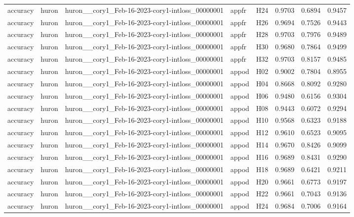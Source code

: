 \begin{table}[tbp]
\begin{tabular}{lllllrrr}
accuracy & huron & huron\_\_cory1\_Feb-16-2023-cory1-intloss\_00000001 & appfr & H24 & 0.9703 & 0.6894 & 0.9457 \\
accuracy & huron & huron\_\_cory1\_Feb-16-2023-cory1-intloss\_00000001 & appfr & H26 & 0.9694 & 0.7526 & 0.9443 \\
accuracy & huron & huron\_\_cory1\_Feb-16-2023-cory1-intloss\_00000001 & appfr & H28 & 0.9703 & 0.7976 & 0.9489 \\
accuracy & huron & huron\_\_cory1\_Feb-16-2023-cory1-intloss\_00000001 & appfr & H30 & 0.9680 & 0.7864 & 0.9499 \\
accuracy & huron & huron\_\_cory1\_Feb-16-2023-cory1-intloss\_00000001 & appfr & H32 & 0.9703 & 0.8157 & 0.9485 \\
accuracy & huron & huron\_\_cory1\_Feb-16-2023-cory1-intloss\_00000001 & appod & H02 & 0.9002 & 0.7804 & 0.8955 \\
accuracy & huron & huron\_\_cory1\_Feb-16-2023-cory1-intloss\_00000001 & appod & H04 & 0.8668 & 0.8092 & 0.9280 \\
accuracy & huron & huron\_\_cory1\_Feb-16-2023-cory1-intloss\_00000001 & appod & H06 & 0.9480 & 0.6156 & 0.9304 \\
accuracy & huron & huron\_\_cory1\_Feb-16-2023-cory1-intloss\_00000001 & appod & H08 & 0.9443 & 0.6072 & 0.9294 \\
accuracy & huron & huron\_\_cory1\_Feb-16-2023-cory1-intloss\_00000001 & appod & H10 & 0.9568 & 0.6323 & 0.9188 \\
accuracy & huron & huron\_\_cory1\_Feb-16-2023-cory1-intloss\_00000001 & appod & H12 & 0.9610 & 0.6523 & 0.9095 \\
accuracy & huron & huron\_\_cory1\_Feb-16-2023-cory1-intloss\_00000001 & appod & H14 & 0.9670 & 0.8426 & 0.9099 \\
accuracy & huron & huron\_\_cory1\_Feb-16-2023-cory1-intloss\_00000001 & appod & H16 & 0.9689 & 0.8431 & 0.9290 \\
accuracy & huron & huron\_\_cory1\_Feb-16-2023-cory1-intloss\_00000001 & appod & H18 & 0.9689 & 0.6421 & 0.9211 \\
accuracy & huron & huron\_\_cory1\_Feb-16-2023-cory1-intloss\_00000001 & appod & H20 & 0.9661 & 0.6773 & 0.9197 \\
accuracy & huron & huron\_\_cory1\_Feb-16-2023-cory1-intloss\_00000001 & appod & H22 & 0.9661 & 0.7043 & 0.9136 \\
accuracy & huron & huron\_\_cory1\_Feb-16-2023-cory1-intloss\_00000001 & appod & H24 & 0.9684 & 0.7006 & 0.9164 \\

\end{tabular}
\end{table}
